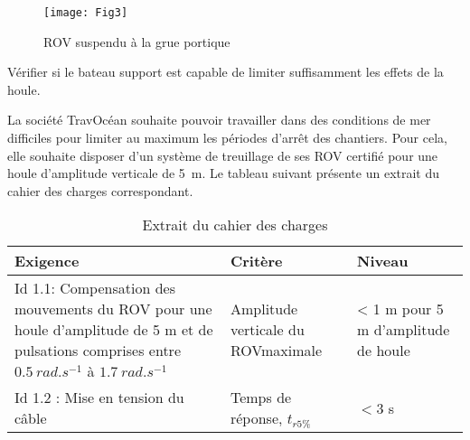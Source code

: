 %
%
%
%
%
%

\ifprof
\else
\begin{figure}[!h]
\centering
\texttt{[image: Fig3]}
\caption{ROV suspendu à la grue portique}
\label{Fig3}
\end{figure}
\fi



\begin{obj}
Vérifier si le bateau support est capable de limiter suffisamment les effets de la houle.
\end{obj}


\ifprof
\else
La société TravOcéan souhaite pouvoir travailler dans des conditions de mer difficiles pour limiter au maximum
les périodes d’arrêt des chantiers. Pour cela, elle souhaite disposer d’un système de treuillage de ses ROV
certifié pour une houle d’amplitude verticale de \SI{5}{m}. Le tableau suivant 
présente un extrait du cahier des charges correspondant.

\footnotesize
\begin{table*}[!h]
\begin{tabular}{p{9cm}p{4cm}p{4cm}}
\hline
\textbf{Exigence} &\textbf{Critère}& \textbf{Niveau}\\
\hline
Id 1.1: 
Compensation des mouvements du ROV pour une houle d’amplitude de 5 m et de pulsations comprises
entre $\SI{0,5}{rad.s^{-1}}$ à $\SI{1,7}{rad. s^{-1}}$ 
&Amplitude verticale du ROVmaximale&< 1 m pour 5 m d’amplitude de houle\\
Id 1.2 : 
Mise en tension du câble &Temps de réponse, $t_{r5\%}$ & $< 3$ s \\
\hline
\end{tabular}

\caption{Extrait du cahier des charges}
\label{tab1}
\end{table*}

